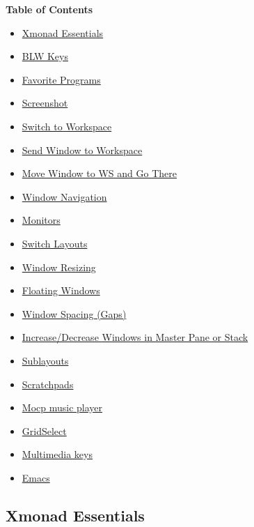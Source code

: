 \textbf{Table of Contents}

\begin{itemize}
\tightlist
\item
  \protect\hyperlink{xmonad-essentials}{Xmonad Essentials}
\item
  \protect\hyperlink{blw-keys}{BLW Keys}
\item
  \protect\hyperlink{favorite-programs}{Favorite Programs}
\item
  \protect\hyperlink{screenshot}{Screenshot}
\item
  \protect\hyperlink{switch-to-workspace}{Switch to Workspace}
\item
  \protect\hyperlink{send-window-to-workspace}{Send Window to Workspace}
\item
  \protect\hyperlink{move-window-to-ws-and-go-there}{Move Window to WS
  and Go There}
\item
  \protect\hyperlink{window-navigation}{Window Navigation}
\item
  \protect\hyperlink{monitors}{Monitors}
\item
  \protect\hyperlink{switch-layouts}{Switch Layouts}
\item
  \protect\hyperlink{window-resizing}{Window Resizing}
\item
  \protect\hyperlink{floating-windows}{Floating Windows}
\item
  \protect\hyperlink{window-spacing-gaps}{Window Spacing (Gaps)}
\item
  \protect\hyperlink{increasedecrease-windows-in-master-pane-or-stack}{Increase/Decrease
  Windows in Master Pane or Stack}
\item
  \protect\hyperlink{sublayouts}{Sublayouts}
\item
  \protect\hyperlink{scratchpads}{Scratchpads}
\item
  \protect\hyperlink{mocp-music-player}{Mocp music player}
\item
  \protect\hyperlink{gridselect}{GridSelect}
\item
  \protect\hyperlink{multimedia-keys}{Multimedia keys}
\item
  \protect\hyperlink{emacs}{Emacs}
\end{itemize}

\hypertarget{xmonad-essentials}{%
\subsection{Xmonad Essentials}\label{xmonad-essentials}}

